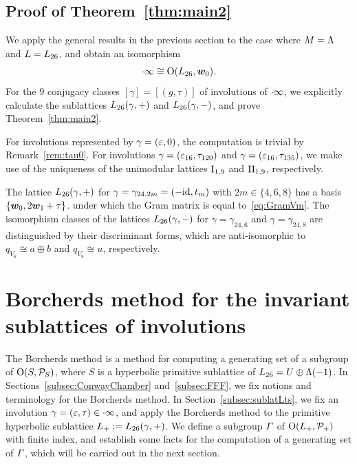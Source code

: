 \documentclass{amsart} %
\begin{document}
\subsection{Proof of Theorem~\ref{thm:main2}}\label{subsec:proofmain2}
%
We apply the general results in the previous section to the case where $M=\Lambda$ and $L=L_{26}$,
and obtain an isomorphism 
\[
\cdot \infty\cong \mathord{\mathrm{O}}(L_{26}, \boldsymbol{w}_0).
\]
For the $9$ conjugacy classes 
$[\gamma]=[(g, \tau)]$ of involutions of $\cdot \infty$,
we explicitly calculate the sublattices $L_{26}(\gamma, +)$ and $L_{26}(\gamma, -)$, 
and prove Theorem~\ref{thm:main2}.
%
\begin{remark}
For involutions represented by $\gamma=(\varepsilon, 0)$,
the computation is trivial by Remark~\ref{rem:tau0}.
For involutions $\gamma=(\varepsilon_{16},\tau_{120})$ and $\gamma=(\varepsilon_{16},\tau_{135})$,
we make use of the uniqueness of the unimodular lattices $\mathrm{I}_{1, 9}$ and $\mathrm{II}_{1, 9}$,
respectively.
\end{remark}
%
%
%
\begin{remark}
The lattice $L_{26}(\gamma,+)$ for $\gamma=\gamma_{24,2m}=(-\mathord{\mathrm{id}}, t_m)$
with $2m \in \{4,6,8\}$ has a basis $\{\boldsymbol{w}_0, 2\boldsymbol{w}_1+\tau\}$.
under which the Gram matrix is equal to~\eqref{eq:GramVm}.
The isomorphism classes of the lattices $L_{26}(\gamma,-)$ for $\gamma=\gamma_{24,6}$ 
and $\gamma=\gamma_{24,8}$ 
are distinguished by their discriminant forms,
which are anti-isomorphic to $q_{V_6}\cong a\oplus b$ and $q_{V_8}\cong u$, respectively. 
 \end{remark}
%
%
%
\section{Borcherds method for the invariant sublattices of involutions}\label{sec:Borcherds}
%
The Borcherds method is a method for computing a generating set of 
a subgroup of  $\mathord{\mathrm{O}}(S, \mathord{\mathcal{P}}_S)$, %
where $S$ is  a hyperbolic primitive sublattice of $L_{26}=U\oplus \Lambda(-1)$.
In Sections~\ref{subsec:ConwayChamber} and~\ref{subsec:FFF},
we fix notions and terminology for the Borcherds method.
In Section~\ref{subsec:sublatLts}, 
we fix an involution
$\gamma=(\varepsilon, \tau)\in \cdot \infty$, and 
apply the Borcherds method to the primitive hyperbolic sublattice
$L_{+}:=L_{26}(\gamma, +)$.
We define a subgroup $\varGamma$ of $ \mathord{\mathrm{O}}(L_{+}, \mathord{\mathcal{P}}_{+})$
with finite index, and establish some facts
for the computation of a  generating set of
 $\varGamma$, which will be carried out in the next section.
%
%
\end{document}
